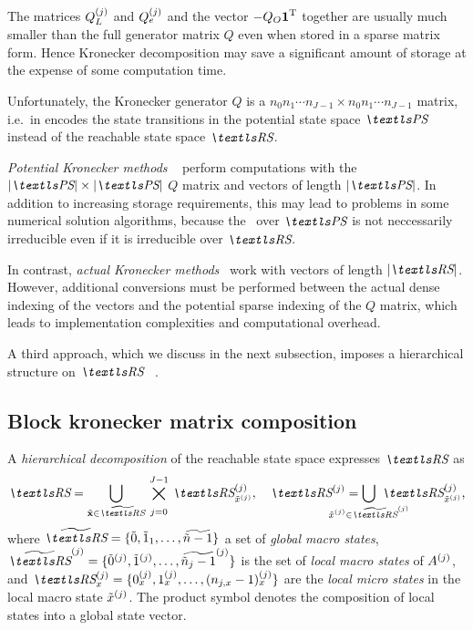 The matrices $Q_L^{(j)}$ and $Q_e^{(j)}$ and the vector
$-Q_O \bm{\mathrm{1}}^{\mathrm{T}}$ together are usually much smaller than the full
generator matrix $Q$ even when stored in a sparse matrix form. Hence
Kronecker decomposition may save a significant amount of storage at
the expense of some computation time.

Unfortunately, the Kronecker generator $Q$ is a
$n_0 n_1 \cdots n_{J - 1} \times n_0 n_1 \cdots n_{J - 1}$ matrix,
i.e.~in encodes the state transitions in the potential state space
$\PS$ instead of the reachable state space $\RS$.

\emph{Potential Kronecker methods}%
~\citep{DBLP:journals/informs/BuchholzCDK00} perform computations with
the $\lvert \PS \rvert \times \lvert \PS \rvert$ $Q$ matrix and
vectors of length $\lvert \PS \rvert$. In addition to increasing
storage requirements, this may lead to problems in some numerical
solution algorithms, because the \CTMC\ over $\PS$ is not neccessarily
irreducible even if it is irreducible over $\RS$.

In contrast, \emph{actual Kronecker methods}~%
\citep{DBLP:journals/tse/Kemper96,%
  DBLP:journals/informs/BuchholzCDK00,%
  DBLP:journals/fgcs/BenoitPS06} work with vectors of length
$\lvert \RS \rvert$. However, additional conversions must be performed
between the actual dense indexing of the vectors and the potential
sparse indexing of the $Q$ matrix, which leads to implementation
complexities and computational overhead.

A third approach, which we discuss in the next subsection, imposes a
hierarchical structure on $\RS$~%
\citep{DBLP:conf/cpe/BauseBK98,%
  DBLP:journals/sigmetrics/BuchholzK98,%
  DBLP:journals/tse/Buchholz99}.

\subsection{Block kronecker matrix composition}

A \emph{hierarchical decomposition} of the reachable state space expresses
$\RS$ as
\begin{equation}
  \RS = \bigcup_{\macro{\vec{x}} \in \Macro{\RS}} \,
  \bigtimes_{\vphantom{\Macro{\RS}}j = 0}^{J - 1}
  \, \loc{\RS}{j}_{\loc{\macro{x}}{j}}, \quad
  \loc{\RS}{j} = \bigcup_{\mathclap{\loc{\macro{x}}{j} \in \loc{\Macro{\RS}}{j}}}
  \,\, \loc{\RS}{j}_{\loc{\macro{x}}{j}} \text,
\end{equation}
where
$\Macro{\RS} = \{\macro{0}, \macro{1}_1, \ldots, \Macro{\macro{n} - 1}
\}$
a set of \emph{global macro states},
$\loc{\Macro{\RS}}{j} = \{\loc{\macro{0}}{j}, \loc{\macro{1}}{j},
\ldots, \loc{\Macro{\macro{n}_j - 1}}{j} \}$ is the set of \emph{local
macro states} of $A^{(j)}$, and $\loc{\RS}{j}_{x} = \{\loc{0}{j}_x,
\loc{1}{j}_x, \ldots, \loc{(n_{j, x} - 1)}{j}_x \}$ are the
\emph{local micro states} in the local macro state
$\tilde{x}^{(j)}$. The product symbol denotes the composition of
local states into a global state vector.

